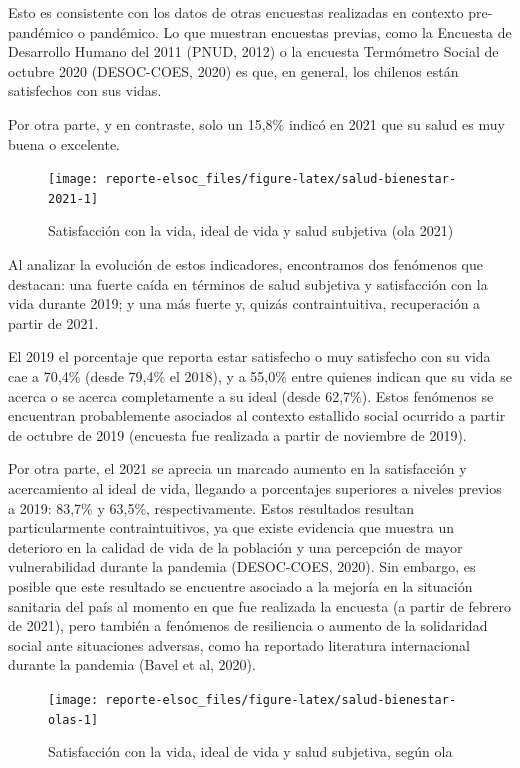 \documentclass[
  12pt,
]{book}
\begin{document}
Esto es consistente con los datos de otras encuestas realizadas en contexto pre-pandémico o pandémico. Lo que muestran encuestas previas, como la Encuesta de Desarrollo Humano del 2011 (PNUD, 2012) o la encuesta Termómetro Social de octubre 2020 (DESOC-COES, 2020) es que, en general, los chilenos están satisfechos con sus vidas.

Por otra parte, y en contraste, solo un 15,8\% indicó en 2021 que su salud es muy buena o excelente.

\begin{figure}

{\centering \texttt{[image: reporte-elsoc\_files/figure-latex/salud-bienestar-2021-1]} 

}

\caption{Satisfacción con la vida, ideal de vida y salud subjetiva (ola 2021)}\label{fig:salud-bienestar-2021}
\end{figure}

Al analizar la evolución de estos indicadores, encontramos dos fenómenos que destacan: una fuerte caída en términos de salud subjetiva y satisfacción con la vida durante 2019; y una más fuerte y, quizás contraintuitiva, recuperación a partir de 2021.

El 2019 el porcentaje que reporta estar satisfecho o muy satisfecho con su vida cae a 70,4\% (desde 79,4\% el 2018), y a 55,0\% entre quienes indican que su vida se acerca o se acerca completamente a su ideal (desde 62,7\%). Estos fenómenos se encuentran probablemente asociados al contexto estallido social ocurrido a partir de octubre de 2019 (encuesta fue realizada a partir de noviembre de 2019).

Por otra parte, el 2021 se aprecia un marcado aumento en la satisfacción y acercamiento al ideal de vida, llegando a porcentajes superiores a niveles previos a 2019: 83,7\% y 63,5\%, respectivamente. Estos resultados resultan particularmente contraintuitivos, ya que existe evidencia que muestra un deterioro en la calidad de vida de la población y una percepción de mayor vulnerabilidad durante la pandemia (DESOC-COES, 2020). Sin embargo, es posible que este resultado se encuentre asociado a la mejoría en la situación sanitaria del país al momento en que fue realizada la encuesta (a partir de febrero de 2021), pero también a fenómenos de resiliencia o aumento de la solidaridad social ante situaciones adversas, como ha reportado literatura internacional durante la pandemia (Bavel et al, 2020).

\begin{figure}

{\centering \texttt{[image: reporte-elsoc\_files/figure-latex/salud-bienestar-olas-1]} 

}

\caption{Satisfacción con la vida, ideal de vida y salud subjetiva, según ola}\label{fig:salud-bienestar-olas}
\end{figure}
\end{document}
